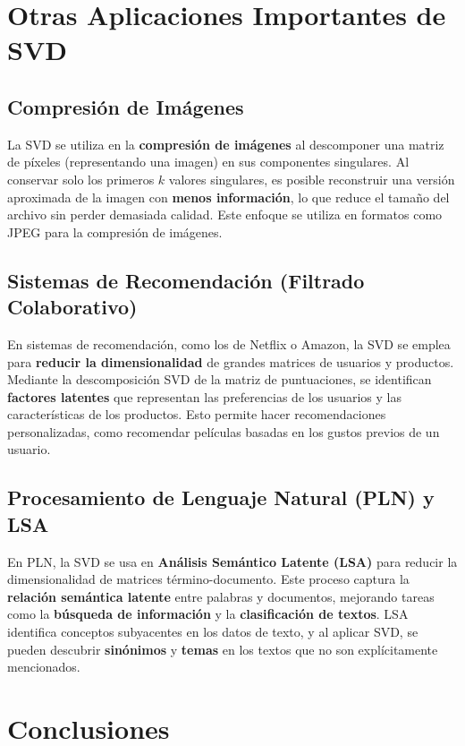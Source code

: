 \documentclass{article}
\begin{document}
\section{Otras Aplicaciones Importantes de SVD}

\subsection{ Compresión de Imágenes}

La SVD se utiliza en la \textbf{compresión de imágenes} al descomponer una matriz de píxeles (representando una imagen) en sus componentes singulares. Al conservar solo los primeros \(k\) valores singulares, es posible reconstruir una versión aproximada de la imagen con \textbf{menos información}, lo que reduce el tamaño del archivo sin perder demasiada calidad. Este enfoque se utiliza en formatos como JPEG para la compresión de imágenes.

\subsection{ Sistemas de Recomendación (Filtrado Colaborativo)}

En sistemas de recomendación, como los de Netflix o Amazon, la SVD se emplea para \textbf{reducir la dimensionalidad} de grandes matrices de usuarios y productos. Mediante la descomposición SVD de la matriz de puntuaciones, se identifican \textbf{factores latentes} que representan las preferencias de los usuarios y las características de los productos. Esto permite hacer recomendaciones personalizadas, como recomendar películas basadas en los gustos previos de un usuario.

\subsection{ Procesamiento de Lenguaje Natural (PLN) y LSA}

En PLN, la SVD se usa en \textbf{Análisis Semántico Latente (LSA)} para reducir la dimensionalidad de matrices término-documento. Este proceso captura la \textbf{relación semántica latente} entre palabras y documentos, mejorando tareas como la \textbf{búsqueda de información} y la \textbf{clasificación de textos}. LSA identifica conceptos subyacentes en los datos de texto, y al aplicar SVD, se pueden descubrir \textbf{sinónimos} y \textbf{temas} en los textos que no son explícitamente mencionados.

\section{Conclusiones}
\end{document}
